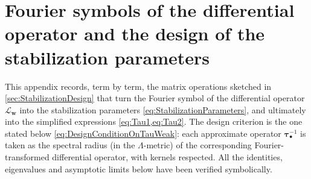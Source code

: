 %
%
%
%
\section{Fourier symbols of the differential operator and the design of the stabilization parameters}\label{app:FourierTau}

This appendix records, term by term, the matrix operations sketched in \cref{sec:StabilizationDesign} that turn the Fourier symbol of the differential operator $\mathcal{L}_{\boldsymbol{w}}$ into the stabilization parameters \cref{eq:StabilizationParameters}, and ultimately into the simplified expressions \cref{eq:Tau1,eq:Tau2}. The design criterion is the one stated below \cref{eq:DesignConditionOnTauWeak}: each approximate operator $\boldsymbol{\tau}_\bullet^{-1}$ is taken as the spectral radius (in the $\Lambda$-metric) of the corresponding Fourier-transformed differential operator, with kernels respected. All the identities, eigenvalues and asymptotic limits below have been verified symbolically.

